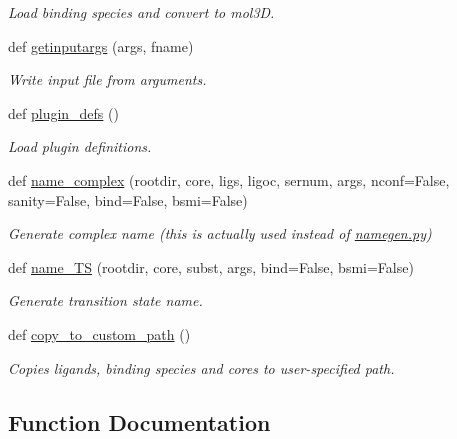 \begin{DoxyCompactItemize}
\begin{DoxyCompactList}\small\item\em Load binding species and convert to mol3D. \end{DoxyCompactList}\item 
def \hyperlink{namespacemolSimplify_1_1Scripts_1_1io_a35adde459c31b3eeb5eb3b3f2a38a223}{getinputargs} (args, fname)
\begin{DoxyCompactList}\small\item\em Write input file from arguments. \end{DoxyCompactList}\item 
def \hyperlink{namespacemolSimplify_1_1Scripts_1_1io_a40650c28fe10183161a82e7127674f61}{plugin\+\_\+defs} ()
\begin{DoxyCompactList}\small\item\em Load plugin definitions. \end{DoxyCompactList}\item 
def \hyperlink{namespacemolSimplify_1_1Scripts_1_1io_a64818a07711beacbd714d2c843c51862}{name\+\_\+complex} (rootdir, core, ligs, ligoc, sernum, args, nconf=False, sanity=False, bind=False, bsmi=False)
\begin{DoxyCompactList}\small\item\em Generate complex name (this is actually used instead of \hyperlink{namegen_8py}{namegen.\+py}) \end{DoxyCompactList}\item 
def \hyperlink{namespacemolSimplify_1_1Scripts_1_1io_a11b47a571bc01ae75ddbb581dc577349}{name\+\_\+\+TS} (rootdir, core, subst, args, bind=False, bsmi=False)
\begin{DoxyCompactList}\small\item\em Generate transition state name. \end{DoxyCompactList}\item 
def \hyperlink{namespacemolSimplify_1_1Scripts_1_1io_ae7ce81f03a95bf70a0356d8075a4c9f3}{copy\+\_\+to\+\_\+custom\+\_\+path} ()
\begin{DoxyCompactList}\small\item\em Copies ligands, binding species and cores to user-\/specified path. \end{DoxyCompactList}\end{DoxyCompactItemize}


\subsection{Function Documentation}
\mbox{\label{namespacemolSimplify_1_1Scripts_1_1io_ad95d532bb8edb4c9c6ee556ba093b7e1}} 
